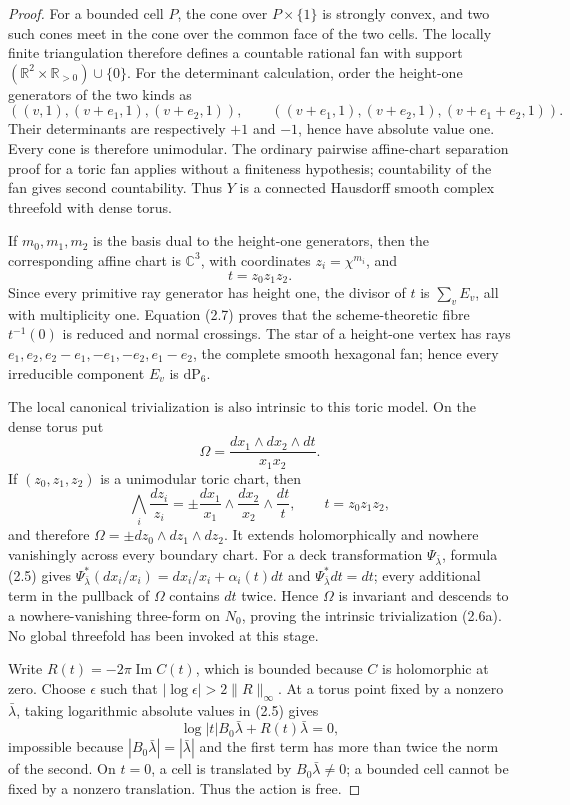 \begin{proof}
For a bounded cell \(P\), the cone over \(P\times\{1\}\) is strongly
convex, and two such cones meet in the cone over the common face of the two
cells.  The locally finite triangulation therefore defines a countable
rational fan with support
\((\mathbb R^2\times\mathbb R_{>0})\cup\{0\}\).  For the determinant
calculation, order the height-one generators of the two kinds as
\[
 ((v,1),(v+e_1,1),(v+e_2,1)),\qquad
 ((v+e_1,1),(v+e_2,1),(v+e_1+e_2,1)).
\]
Their determinants are respectively \(+1\) and \(-1\), hence have absolute
value one.  Every cone is therefore unimodular.  The ordinary pairwise affine-chart
separation proof for a toric fan applies without a finiteness hypothesis;
countability of the fan gives second countability.  Thus \(Y\) is a
connected Hausdorff smooth complex threefold with dense torus.

If \(m_0,m_1,m_2\) is the basis dual to the height-one generators, then the
corresponding affine chart is \(\mathbb C^3\), with coordinates
\(z_i=\chi^{m_i}\), and
\[
 t=z_0z_1z_2.
\tag{2.7}
\]
Since every primitive ray generator has height one, the divisor of \(t\) is
\(\sum_vE_v\), all with multiplicity one.  Equation (2.7) proves that the
scheme-theoretic fibre \(t^{-1}(0)\) is reduced and normal crossings.
The star of a height-one vertex has rays
\(e_1,e_2,e_2-e_1,-e_1,-e_2,e_1-e_2\), the complete smooth hexagonal fan;
hence every irreducible component \(E_v\) is \(\mathrm{dP}_6\).

The local canonical trivialization is also intrinsic to this toric model.
On the dense torus put
\[
 \Omega=\frac{dx_1\wedge dx_2\wedge dt}{x_1x_2}.
\]
If \((z_0,z_1,z_2)\) is a unimodular toric chart, then
\[
 \bigwedge_i\frac{dz_i}{z_i}
 =\pm\frac{dx_1}{x_1}\wedge\frac{dx_2}{x_2}\wedge\frac{dt}{t},
 \qquad t=z_0z_1z_2,
\]
and therefore \(\Omega=\pm dz_0\wedge dz_1\wedge dz_2\).  It extends
holomorphically and nowhere vanishingly across every boundary chart.
For a deck transformation \(\Psi_{\bar\lambda}\), formula (2.5) gives
\(\Psi_{\bar\lambda}^*(dx_i/x_i)=dx_i/x_i+\alpha_i(t)dt\) and
\(\Psi_{\bar\lambda}^*dt=dt\); every additional term in the pullback of
\(\Omega\) contains \(dt\) twice.  Hence \(\Omega\) is invariant and descends
to a nowhere-vanishing three-form on \(N_0\), proving the intrinsic
trivialization (2.6a).  No global threefold has been invoked at this stage.

Write \(R(t)=-2\pi\operatorname{Im}C(t)\), which is bounded because \(C\)
is holomorphic at zero.  Choose \(\epsilon\) such that
\(|\log\epsilon|>2\|R\|_\infty\).  At a torus point fixed by a nonzero
\(\bar\lambda\), taking logarithmic absolute values in (2.5) gives
\[
 \log|t|B_0\bar\lambda+R(t)\bar\lambda=0,
\]
impossible because \(|B_0\bar\lambda|=|\bar\lambda|\) and the first term
has more than twice the norm of the second.  On \(t=0\), a cell is translated
by \(B_0\bar\lambda\ne0\); a bounded cell cannot be fixed by a nonzero
translation.  Thus the action is free.


\end{proof}
